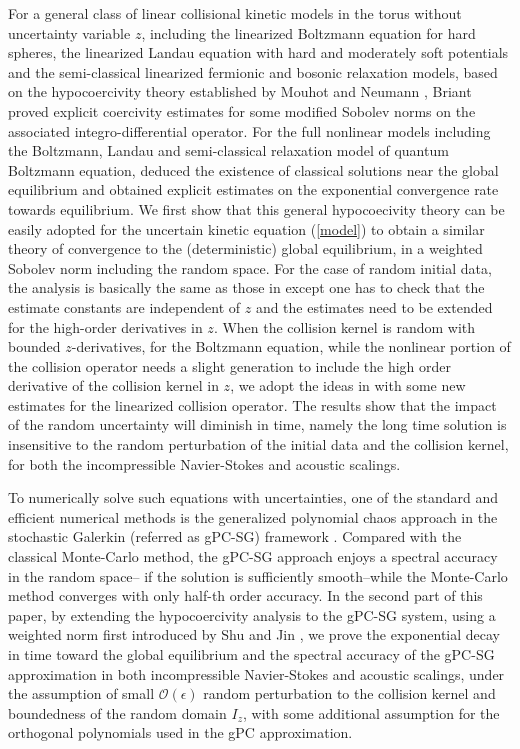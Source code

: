 \documentclass[final,onefignum,onetabnum]{siamart171218}
\begin{document}
For a general class of linear collisional kinetic models in the torus without
uncertainty variable $z$, including the linearized Boltzmann equation for hard spheres,
the linearized Landau equation with hard and moderately soft potentials and the semi-classical linearized fermionic and bosonic relaxation models,
based on the hypocoercivity theory established by Mouhot and Neumann \cite{CN},
Briant \cite{MB} proved explicit coercivity estimates for some modified Sobolev norms on the associated integro-differential operator. For the full
nonlinear models including the Boltzmann, Landau and semi-classical relaxation model of quantum Boltzmann equation,  \cite{MB} deduced the existence of classical solutions near the global equilibrium and obtained explicit estimates on the exponential
convergence rate towards equilibrium. We first show that this general hypocoecivity theory can be easily adopted for the uncertain kinetic equation (\ref{model}) to obtain a similar theory of convergence to the (deterministic) global
equilibrium, in a weighted Sobolev norm including the
random space. For the case of random initial data, the analysis
is basically the same as those in \cite{MB} except one has to check that
the estimate constants are independent of $z$ and the estimates need to be extended
for the high-order derivatives in $z$.  
When the collision kernel is random with bounded $z$-derivatives, 
for the Boltzmann equation, 
while the nonlinear portion of the collision operator needs
a slight generation to include the high order derivative of the collision kernel in $z$, 
we adopt the ideas in \cite{Ma, Liu} with some new estimates for the linearized collision operator. 
The results
show that the impact of the random uncertainty will
diminish in time, namely the long time solution is insensitive to the random
perturbation of the initial data and the collision kernel, for both the
incompressible Navier-Stokes and acoustic scalings.

To numerically solve such equations with uncertainties, one of the standard
and efficient numerical methods is the generalized polynomial chaos approach in the stochastic Galerkin (referred as gPC-SG)
framework \cite{Ghanem, GWZ, Xiu, XZJ, Hu, HuReview}.
Compared with the classical Monte-Carlo method, the gPC-SG approach enjoys a spectral accuracy in the random space--
if the solution is sufficiently smooth--while the Monte-Carlo method converges with only half-th order accuracy.
In the second part of this paper, by extending the hypocoercivity
analysis to the gPC-SG system, using a weighted norm first introduced by Shu
and Jin \cite{Rui}, we prove the exponential decay in time toward the global equilibrium
and the spectral accuracy of the gPC-SG approximation in both incompressible
Navier-Stokes and acoustic scalings,
under the assumption of small $\mathcal O(\epsilon)$ random perturbation to the collision kernel and
boundedness of the random domain $I_z$, with some additional assumption
for the orthogonal polynomials used in the gPC approximation.
\end{document}
